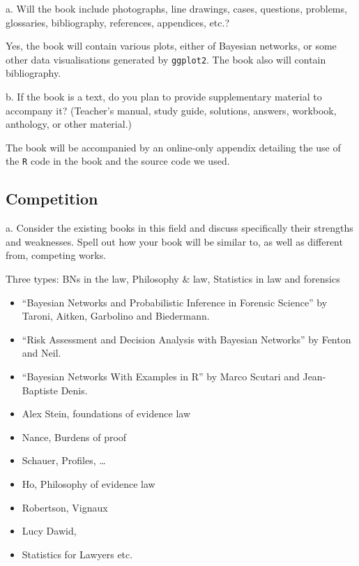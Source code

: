 \documentclass[10pt,dvipsnames,enabledeprecatedfontcommands]{scrartcl}
\begin{document}
\footnotesize a. Will the book include photographs, line drawings,
cases, questions, problems, glossaries, bibliography, references,
appendices, etc.?

\vspace{2mm}

\normalsize

Yes, the book will contain various plots, either of Bayesian networks,
or some other data visualisations generated by \texttt{ggplot2}. The
book also will contain bibliography. \vspace{2mm}

\footnotesize b. If the book is a text, do you plan to provide
supplementary material to accompany it? (Teacher's manual, study guide,
solutions, answers, workbook, anthology, or other material.)

\vspace{2mm}

\normalsize

The book will be accompanied by an online-only appendix detailing the
use of the \texttt{R} code in the book and the source code we used.

\hypertarget{competition}{%
\subsection{Competition}\label{competition}}

\footnotesize a. Consider the existing books in this field and discuss
specifically their strengths and weaknesses. Spell out how your book
will be similar to, as well as different from, competing works.


\normalsize

Three types: BNs in the law, Philosophy \& law, Statistics in law and
forensics

\begin{itemize}
\item
  ``Bayesian Networks and Probabilistic Inference in Forensic Science''
  by Taroni, Aitken, Garbolino and Biedermann.
\item
  ``Risk Assessment and Decision Analysis with Bayesian Networks'' by
  Fenton and Neil.
\item
  ``Bayesian Networks With Examples in R'' by Marco Scutari and
  Jean-Baptiste Denis.
\item
  Alex Stein, foundations of evidence law
\item
  Nance, Burdens of proof
\item
  Schauer, Profiles, \dots
\item
  Ho, Philosophy of evidence law
\item
  Robertson, Vignaux
\item
  Lucy Dawid,
\item
  Statistics for Lawyers etc.
\end{itemize}
\end{document}
